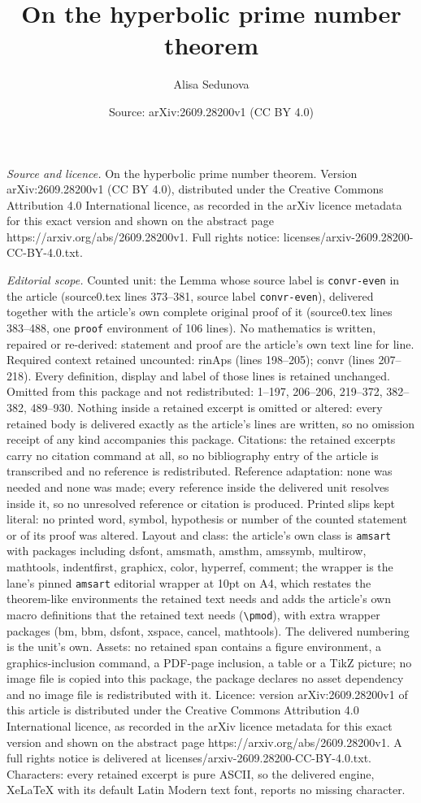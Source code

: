 \documentclass[10pt,a4paper]{amsart}
\title[On the hyperbolic prime number theorem]{On the hyperbolic prime number theorem}
\author{Alisa Sedunova}
\date{Source: arXiv:2609.28200v1 (CC BY 4.0)}
\begin{document}
\maketitle

\noindent\emph{Source and licence.} On the hyperbolic prime number theorem. Version arXiv:2609.28200v1 (CC BY 4.0), distributed under the Creative Commons Attribution 4.0 International licence, as recorded in the arXiv licence metadata for this exact version and shown on the abstract page https://arxiv.org/abs/2609.28200v1. Full rights notice: licenses/arxiv-2609.28200-CC-BY-4.0.txt.\par\smallskip

\noindent\textit{Editorial scope.} Counted unit: the Lemma whose source label is \texttt{convr-even} in the article (source0.tex lines 373--381, source label \texttt{convr-even}), delivered together with the article's own complete original proof of it (source0.tex lines 383--488, one \texttt{proof} environment of 106 lines). No mathematics is written, repaired or re-derived: statement and proof are the article's own text line for line. Required context retained uncounted: rinAps (lines 198--205); convr (lines 207--218). Every definition, display and label of those lines is retained unchanged. Omitted from this package and not redistributed: 1--197, 206--206, 219--372, 382--382, 489--930. Nothing inside a retained excerpt is omitted or altered: every retained body is delivered exactly as the article's lines are written, so no omission receipt of any kind accompanies this package. Citations: the retained excerpts carry no citation command at all, so no bibliography entry of the article is transcribed and no reference is redistributed. Reference adaptation: none was needed and none was made; every reference inside the delivered unit resolves inside it, so no unresolved reference or citation is produced. Printed slips kept literal: no printed word, symbol, hypothesis or number of the counted statement or of its proof was altered. Layout and class: the article's own class is \texttt{amsart} with packages including dsfont, amsmath, amsthm, amssymb, multirow, mathtools, indentfirst, graphicx, color, hyperref, comment; the wrapper is the lane's pinned \texttt{amsart} editorial wrapper at 10pt on A4, which restates the theorem-like environments the retained text needs and adds the article's own macro definitions that the retained text needs (\texttt{\textbackslash pmod}), with extra wrapper packages (bm, bbm, dsfont, xspace, cancel, mathtools). The delivered numbering is the unit's own. Assets: no retained span contains a figure environment, a graphics-inclusion command, a PDF-page inclusion, a table or a TikZ picture; no image file is copied into this package, the package declares no asset dependency and no image file is redistributed with it. Licence: version arXiv:2609.28200v1 of this article is distributed under the Creative Commons Attribution 4.0 International licence, as recorded in the arXiv licence metadata for this exact version and shown on the abstract page https://arxiv.org/abs/2609.28200v1. A full rights notice is delivered at licenses/arxiv-2609.28200-CC-BY-4.0.txt. Characters: every retained excerpt is pure ASCII, so the delivered engine, XeLaTeX with its default Latin Modern text font, reports no missing character.
\end{document}
